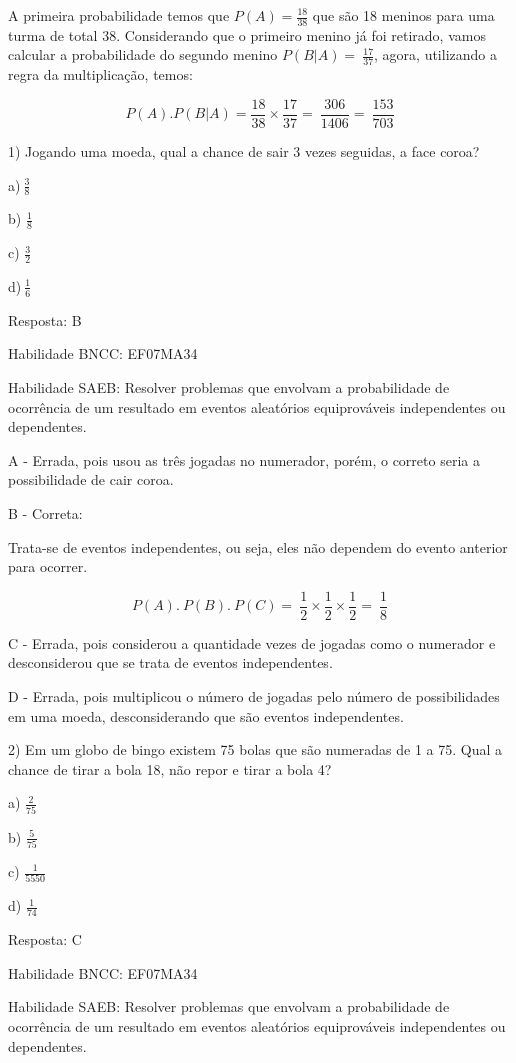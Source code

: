 A primeira probabilidade temos que \(P(A) = \frac{18}{38}\) que são 18
meninos para uma turma de total 38. Considerando que o primeiro menino
já foi retirado, vamos calcular a probabilidade do segundo menino
\(P(B|A) = \ \frac{17}{37}\), agora, utilizando a regra da
multiplicação, temos:

\[P(A).P(B|A) = \frac{18}{38} \times \frac{17}{37} = \ \frac{306}{1406} = \ \frac{153}{703}\]


1) Jogando uma moeda, qual a chance de sair 3 vezes seguidas, a face
coroa?

a)\(\ \frac{3}{8}\)

b) \(\frac{1}{8}\)

c) \(\frac{3}{2}\)

d)\(\ \frac{1}{6}\)

Resposta: B

Habilidade BNCC: EF07MA34

Habilidade SAEB: Resolver problemas que envolvam a probabilidade de
ocorrência de um resultado em eventos aleatórios equiprováveis
independentes ou dependentes.

A - Errada, pois usou as três jogadas no numerador, porém, o correto
seria a possibilidade de cair coroa.

B - Correta:

Trata-se de eventos independentes, ou seja, eles não dependem do evento
anterior para ocorrer.

\[P(A).\ P(B).\ P(C) = \ \frac{1}{2} \times \frac{1}{2} \times \frac{1}{2} = \ \frac{1}{8}\]

C - Errada, pois considerou a quantidade vezes de jogadas como o
numerador e desconsiderou que se trata de eventos independentes.

D - Errada, pois multiplicou o número de jogadas pelo número de
possibilidades em uma moeda, desconsiderando que são eventos
independentes.

2) Em um globo de bingo existem 75 bolas que são numeradas de 1 a 75.
Qual a chance de tirar a bola 18, não repor e tirar a bola 4?

a) \(\frac{2}{75}\)

b) \(\frac{5}{75}\)

c) \(\frac{1}{5550}\)

d) \(\frac{1}{74}\)

Resposta: C

Habilidade BNCC: EF07MA34

Habilidade SAEB: Resolver problemas que envolvam a probabilidade de
ocorrência de um resultado em eventos aleatórios equiprováveis
independentes ou dependentes.

